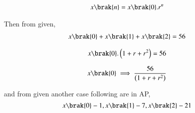 \documentclass[beamer]{IEEEtran}
\theoremstyle{remark}
\begin{document}
\begin{align}
\label{e1}
x\brak{n}=x\brak{0}.r^{n}
\end{align}

Then from given,
\begin{align}
x\brak{0}+x\brak{1}+x\brak{2}=56
\end{align}

\begin{align}
x\brak{0}.\left(1+r+r^2\right)=56
\end{align}

\begin{equation}
\label{q2}
x\brak{0}\implies\frac{56}{\left(1+r+r^2\right)}
\end{equation}

and from given another case following are in AP,
$$
x\brak{0}-1,x\brak{1}-7,x\brak{2}-21
$$
\end{document}
